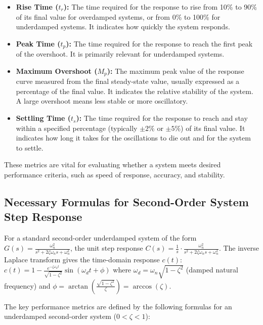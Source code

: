 \documentclass[a4paper,12pt]{article}
\begin{document}
	\begin{itemize}
		\item \textbf{Rise Time ($t_r$):} The time required for the response to rise from 10\% to 90\% of its final value for overdamped systems, or from 0\% to 100\% for underdamped systems. It indicates how quickly the system responds.
		\item \textbf{Peak Time ($t_p$):} The time required for the response to reach the first peak of the overshoot. It is primarily relevant for underdamped systems.
		\item \textbf{Maximum Overshoot ($M_p$):} The maximum peak value of the response curve measured from the final steady-state value, usually expressed as a percentage of the final value. It indicates the relative stability of the system. A large overshoot means less stable or more oscillatory.
		\item \textbf{Settling Time ($t_s$):} The time required for the response to reach and stay within a specified percentage (typically $\pm 2\%$ or $\pm 5\%$) of its final value. It indicates how long it takes for the oscillations to die out and for the system to settle.
	\end{itemize}
	
	These metrics are vital for evaluating whether a system meets desired performance criteria, such as speed of response, accuracy, and stability.
	
	\subsection*{Necessary Formulas for Second-Order System Step Response}
	
	For a standard second-order underdamped system of the form $G(s) = \frac{\omega_n^2}{s^2 + 2\zeta\omega_n s + \omega_n^2}$, the unit step response $C(s) = \frac{1}{s} \cdot \frac{\omega_n^2}{s^2 + 2\zeta\omega_n s + \omega_n^2}$. The inverse Laplace transform gives the time-domain response $c(t)$:
	$c(t) = 1 - \frac{e^{-\zeta\omega_n t}}{\sqrt{1-\zeta^2}} \sin(\omega_d t + \phi)$
	where $\omega_d = \omega_n \sqrt{1-\zeta^2}$ (damped natural frequency) and $\phi = \arctan\left(\frac{\sqrt{1-\zeta^2}}{\zeta}\right) = \arccos(\zeta)$.
	
	The key performance metrics are defined by the following formulas for an underdamped second-order system ($0 < \zeta < 1$):
	
\end{document}

